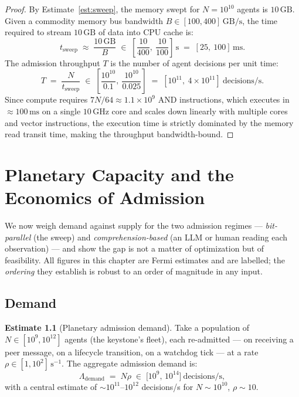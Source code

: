 \documentclass[11pt,oneside]{book}
\theoremstyle{definition}
\newtheorem{estimate}{Estimate}[chapter]
\theoremstyle{plain}
\theoremstyle{remark}
\newcommand{\Bw}{B}                            %
\begin{document}
\begin{proof}
By Estimate~\ref{est:sweep}, the memory swept for $N = 10^{10}$ agents is $10\,\mathrm{GB}$. %
Given a commodity memory bus bandwidth $\Bw \in [100, 400]\,\mathrm{GB/s}$, the time required to stream $10\,\mathrm{GB}$ of data into CPU cache is:
\[
t_{\text{sweep}} \;\approx\; \frac{10\,\mathrm{GB}}{\Bw} \;\in\; \left[ \frac{10}{400},\ \frac{10}{100} \right]\,\mathrm{s} \;=\; [25,\ 100]\,\mathrm{ms}.
\]
The admission throughput $T$ is the number of agent decisions per unit time:
\[
T \;=\; \frac{N}{t_{\text{sweep}}} \;\in\; \left[ \frac{10^{10}}{0.1},\ \frac{10^{10}}{0.025} \right] \;=\; \left[ 10^{11},\ 4 \times 10^{11} \right]\ \text{decisions/s}.
\]
Since compute requires $7N/64 \approx 1.1 \times 10^9$ AND instructions, which executes in $\approx 100\,\mathrm{ms}$ on a single $10\,\mathrm{GHz}$ core and scales down linearly with multiple cores and vector instructions, the execution time is strictly dominated by the memory read transit time, making the throughput bandwidth-bound. %
\end{proof}

\chapter{Planetary Capacity and the Economics of Admission}
\label{ch:econ}

We now weigh demand against supply for the two admission regimes --- \emph{bit-parallel} (the sweep) and \emph{comprehension-based} (an LLM or human reading each observation) --- and show the gap is not a matter of optimization but of feasibility. %
All figures in this chapter are Fermi estimates and are labelled; the \emph{ordering} they establish is robust to an order of magnitude in any input. %

\section{Demand}

\begin{estimate}[Planetary admission demand]\label{est:demand}
Take a population of $N\in[10^{9},10^{12}]$ agents (the keystone's fleet), each re-admitted --- on receiving a peer message, on a lifecycle transition, on a watchdog tick --- at a rate $\rho\in[1,10^{2}]\,\mathrm{s^{-1}}$. %
The aggregate admission demand is:
\[
\Lambda_{\text{demand}}\;=\;N\rho\;\in\;\bigl[10^{9},\,10^{14}\bigr]\ \text{decisions/s},
\]
with a central estimate of $\sim\!10^{11}$--$10^{12}$ decisions/s for $N\sim 10^{10}$, $\rho\sim 10$. %
\end{estimate}
\end{document}
